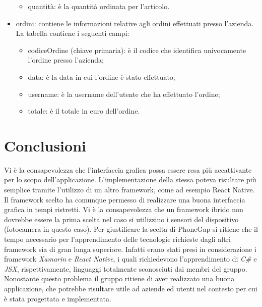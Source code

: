 \documentclass[12pt, a4paper, titlepage]{report}
\begin{document}
\begin{itemize}
\begin{itemize}
			\item quantità: è la quantità ordinata per l'articolo.
		\end{itemize}
		\item ordini: contiene le informazioni relative agli ordini effettuati presso l'azienda. La tabella contiene i seguenti campi:
		\begin{itemize}
			\item codiceOrdine (chiave primaria): è il codice che identifica univocamente l'ordine presso l'azienda;
			\item data: è la data in cui l'ordine è stato effettuato;
			\item username: è la username dell'utente che ha effettuato l'ordine;
			\item totale: è il totale in euro dell'ordine.
		\end{itemize}
	\end{itemize}
	
	\section{Conclusioni}
	Vi è la consapevolezza che l'interfaccia grafica possa essere resa più accattivante per lo scopo dell'applicazione. L'implementazione della stessa poteva risultare più semplice tramite l'utilizzo di un altro framework, come ad esempio React Native. 
	Il framework scelto ha comunque permesso di realizzare una buona interfaccia grafica in tempi ristretti. Vi è la consapevolezza che un framework ibrido non dovrebbe essere la prima scelta nel caso si utilizzino i sensori del dispositivo (fotocamera in questo caso). Per giustificare la scelta di PhoneGap si ritiene che il tempo necessario per l'apprendimento delle tecnologie richieste dagli altri framework sia di gran lunga superiore. Infatti erano stati presi in considerazione i framework \textit{Xamarin} e \textit{React Native}, i quali richiedevono l'apprendimento di \textit{C\#} e \textit{JSX}, rispettivamente, linguaggi totalmente sconosciuti dai membri del gruppo. Nonostante questo problema il gruppo ritiene di aver realizzato una buona applicazione, che potrebbe risultare utile ad aziende ed utenti nel contesto per cui è stata progettata e implementata.
\end{document}
